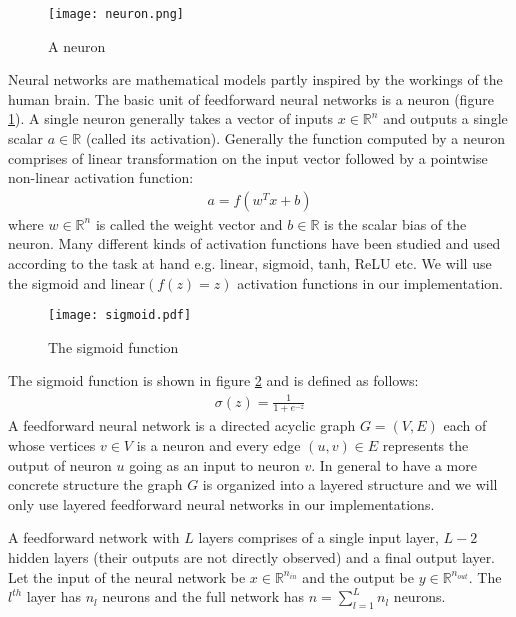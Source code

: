 \begin{figure}[ht]
\begin{center}
\centerline{\texttt{[image: neuron.png]}}
\caption{A neuron}
\label{fig:neuron}
\end{center}
\vskip -0.4in
\end{figure}

Neural networks are mathematical models partly inspired by the workings of the human brain.
The basic unit of feedforward neural networks is a neuron (figure \ref{fig:neuron}).
A single neuron generally takes a vector of inputs $x \in \mathbb{R}^n$ and outputs a single scalar $a \in \mathbb{R}$ (called its activation).
Generally the function computed by a neuron comprises of linear transformation on the input vector followed by a pointwise non-linear activation function:
\begin{align}
a = f(w^T x + b)
\end{align}
where $w \in \mathbb{R}^n$ is called the weight vector and $b \in \mathbb{R}$ is the scalar bias of the neuron.
Many different kinds of activation functions have been studied and used according to the task at hand e.g. linear, sigmoid, tanh, ReLU etc. We will use the sigmoid and linear$(f(z) = z)$ activation functions in our implementation.

\begin{figure}[ht]
\begin{center}
\centerline{\texttt{[image: sigmoid.pdf]}}
\caption{The sigmoid function}
\label{fig:sigmoid}
\end{center}
\vskip -0.2in
\end{figure}

The sigmoid function is shown in figure \ref{fig:sigmoid} and is defined as follows:
\begin{align}
\sigma(z) = \frac{1}{1 + e^{-z}}
\end{align}
A feedforward neural network is a directed acyclic graph $G = (V,E)$ each of whose vertices $v \in V$ is a neuron and every edge $(u,v) \in E$ represents the output of neuron $u$ going as an input to neuron $v$. In general to have a more concrete structure the graph $G$ is organized into a layered structure and we will only use layered feedforward neural networks in our implementations. 

A feedforward network with $L$ layers comprises of a single input layer, $L-2$ hidden layers (their outputs are not directly observed) and a final output layer.
Let the input of the neural network be $x \in \mathbb{R}^{n_{in}}$ and the output be $y \in \mathbb{R}^{n_{out}}$.
The $l^{th}$ layer has $n_l$ neurons and the full network has $n = \sum_{l=1}^L n_l$ neurons. 

